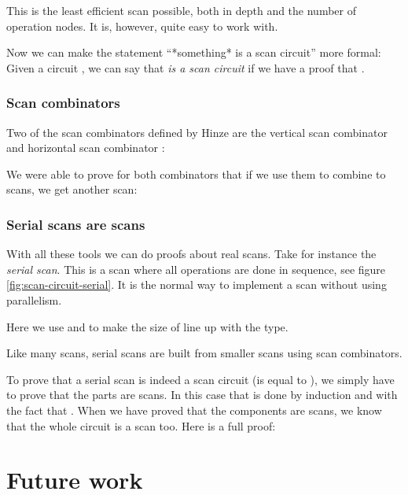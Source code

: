 This is the least efficient scan possible, both in depth and the
number of operation nodes.
It is, however, quite easy to work with.

Now we can make the statement ``*something* is a scan circuit'' more
formal:
Given a circuit  \AY{:}   , we can say that
 \emph{is a scan circuit} if we have a proof that  
 .

\subsubsection{Scan combinators}

Two of the scan combinators defined by Hinze are the vertical scan
combinator  and horizontal scan combinator :


We were able to prove for both combinators that if we use them to
combine to scans, we get another scan:


\subsubsection{Serial scans are scans}

With all these tools we can do proofs about real scans.
Take for instance the \emph{serial scan}.
This is a scan where all operations are done in sequence, see figure
\ref{fig:scan-circuit-serial}.
It is the normal way to implement a scan without using parallelism.

Here we use  and  to make the size of 
\AY{(} \AY{)}    line up with the
type.


Like many scans, serial scans are built from smaller scans using scan
combinators.

To prove that a serial scan is indeed a scan circuit (is equal to
 ), we simply have to prove that the parts are scans.
In this case that is done by induction and with the fact that
    .
When we have proved that the components are scans, we know that the
whole circuit is a scan too. Here is a full proof:


\section{Future work}\label{future-work}


